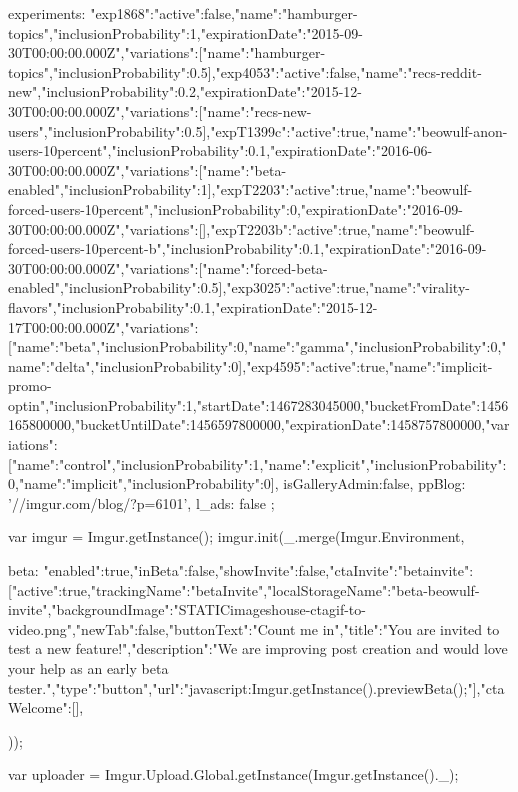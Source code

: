 {{{                experiments:   {"exp1868":{"active":false,"name":"hamburger-topics","inclusionProbability":1,"expirationDate":"2015-09-30T00:00:00.000Z","variations":[{"name":"hamburger-topics","inclusionProbability":0.5}]},"exp4053":{"active":false,"name":"recs-reddit-new","inclusionProbability":0.2,"expirationDate":"2015-12-30T00:00:00.000Z","variations":[{"name":"recs-new-users","inclusionProbability":0.5}]},"expT1399c":{"active":true,"name":"beowulf-anon-users-10percent","inclusionProbability":0.1,"expirationDate":"2016-06-30T00:00:00.000Z","variations":[{"name":"beta-enabled","inclusionProbability":1}]},"expT2203":{"active":true,"name":"beowulf-forced-users-10percent","inclusionProbability":0,"expirationDate":"2016-09-30T00:00:00.000Z","variations":[]},"expT2203b":{"active":true,"name":"beowulf-forced-users-10percent-b","inclusionProbability":0.1,"expirationDate":"2016-09-30T00:00:00.000Z","variations":[{"name":"forced-beta-enabled","inclusionProbability":0.5}]},"exp3025":{"active":true,"name":"virality-flavors","inclusionProbability":0.1,"expirationDate":"2015-12-17T00:00:00.000Z","variations":[{"name":"beta","inclusionProbability":0},{"name":"gamma","inclusionProbability":0},{"name":"delta","inclusionProbability":0}]},"exp4595":{"active":true,"name":"implicit-promo-optin","inclusionProbability":1,"startDate":1467283045000,"bucketFromDate":1456165800000,"bucketUntilDate":1456597800000,"expirationDate":1458757800000,"variations":[{"name":"control","inclusionProbability":1},{"name":"explicit","inclusionProbability":0},{"name":"implicit","inclusionProbability":0}]}},
                isGalleryAdmin:false,
                ppBlog: '//imgur.com/blog/?p=6101',
                l_ads: false
            };

            var imgur = Imgur.getInstance();
            imgur.init(_.merge(Imgur.Environment, {
                
                
                beta: {"enabled":true,"inBeta":false,"showInvite":false,"ctaInvite":{"betainvite":[{"active":true,"trackingName":"betaInvite","localStorageName":"beta-beowulf-invite","backgroundImage":"{STATIC}\/images\/house-cta\/gif-to-video.png","newTab":false,"buttonText":"Count me in","title":"You are invited to test a new feature!","description":"We are improving post creation and would love your help as an early beta tester.","type":"button","url":"javascript:Imgur.getInstance().previewBeta();"}]},"ctaWelcome":[]},
            }));

                            var uploader = Imgur.Upload.Global.getInstance(Imgur.getInstance()._);

}}
